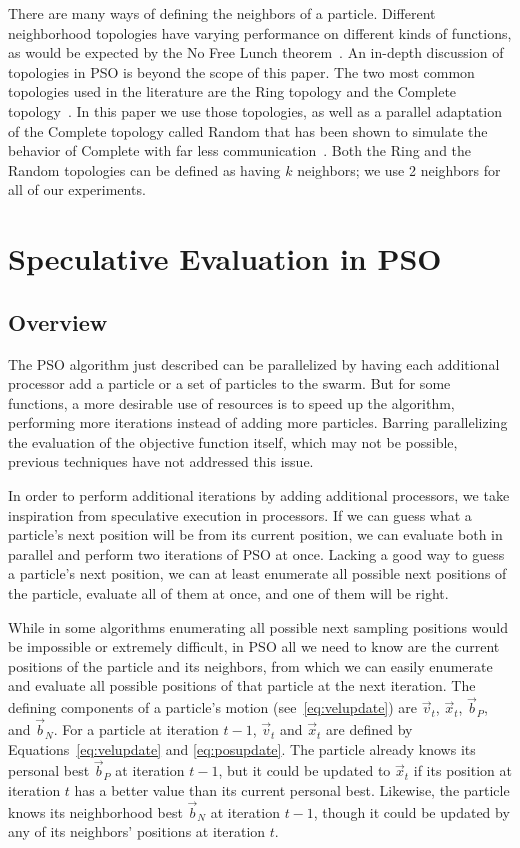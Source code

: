 \documentclass[conference,letterpaper]{IEEEtran}
\providecommand{\ppos}{\ensuremath{\Vec{x}}}
\providecommand{\pvel}{\ensuremath{\Vec{v}}}
\providecommand{\nbest}{\ensuremath{\Vec{b}_N}}
\providecommand{\pbest}{\ensuremath{\Vec{b}_P}}
\begin{document}
There are many ways of defining the neighbors of a particle.  Different
neighborhood topologies have varying performance on different kinds of
functions, as would be expected by the No Free Lunch
theorem~\cite{wolpert-tec97}.  An in-depth discussion of topologies in PSO is
beyond the scope of this paper.  The two most common topologies used in the
literature are the Ring topology and the Complete
topology~\cite{bratton-sis07}.  In this paper we use those topologies, as well
as a parallel adaptation of the Complete topology called Random that has been
shown to simulate the behavior of Complete with far less
communication~\cite{mcnabb-cec09}.  Both the Ring and the Random topologies can
be defined as having $k$ neighbors; we use 2 neighbors for all of our
experiments.

\section{Speculative Evaluation in PSO}
\label{sec:sepso}
\subsection{Overview}

The PSO algorithm just described can be parallelized by having each additional
processor add a particle or a set of particles to the swarm.  But for some
functions, a more desirable use of resources is to speed up the algorithm,
performing more iterations instead of adding more particles.  Barring
parallelizing the evaluation of the objective function itself, which may not be
possible, previous techniques have not addressed this issue.

In order to perform additional iterations by adding additional processors, we
take inspiration from speculative execution in processors.  If we can guess
what a particle's next position will be from its current position, we can
evaluate both in parallel and perform two iterations of PSO at once.  Lacking
a good way to guess a particle's next position, we can at least enumerate all
possible next positions of the particle, evaluate all of them at once, and one
of them will be right.

While in some algorithms enumerating all possible next sampling positions would
be impossible or extremely difficult, in PSO all we need to know are the
current positions of the particle and its neighbors, from which we can easily
enumerate and evaluate all possible positions of that particle at the next
iteration.  The defining components of a particle's motion
(see~\eqref{eq:velupdate}) are $\pvel_t$, $\ppos_t$, $\pbest$, and $\nbest$.
For a particle at iteration $t-1$, $\pvel_t$ and $\ppos_t$ are defined by
Equations~\eqref{eq:velupdate} and \eqref{eq:posupdate}.  The particle already
knows its personal best $\pbest$ at iteration $t-1$, but it could be updated to
$\ppos_t$ if its position at iteration $t$ has a better value than its current
personal best.  Likewise, the particle knows its neighborhood best $\nbest$ at
iteration $t-1$, though it could be updated by any of its neighbors' positions
at iteration $t$.
\end{document}
